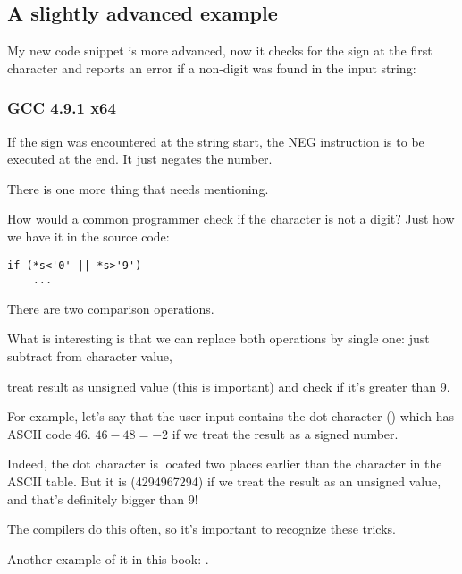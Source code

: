 \subsection{A slightly advanced example}

My new code snippet is more advanced, now it checks for the  sign at the first character
and reports an error if a non-digit was found in the input string:



\subsubsection{\Optimizing GCC 4.9.1 x64}




If the  sign was encountered at the string start, the NEG instruction is to be executed at the end.
It just negates the number.

\label{one_comparison_instead_of_two}
There is one more thing that needs mentioning.

How would a common programmer check if the character is not a digit?
Just how we have it in the source code:

\begin{lstlisting}
if (*s<'0' || *s>'9')
    ...
\end{lstlisting}

There are two comparison operations.

What is interesting is that we can replace both operations by single one:
just subtract  from character value,

treat result as unsigned value (this is important) and check if it's greater than 9.

For example, let's say that the user input contains the dot character () which has \ac{ASCII} code 46.
$46-48=-2$ if we treat the result as a signed number.

Indeed, the dot character is located two places earlier than the  character in the \ac{ASCII} table.
But it is  (4294967294) 
if we treat the result as an unsigned value, and that's definitely bigger than 9!

The compilers do this often, so it's important to recognize these tricks.

Another example of it in this book: 
.

